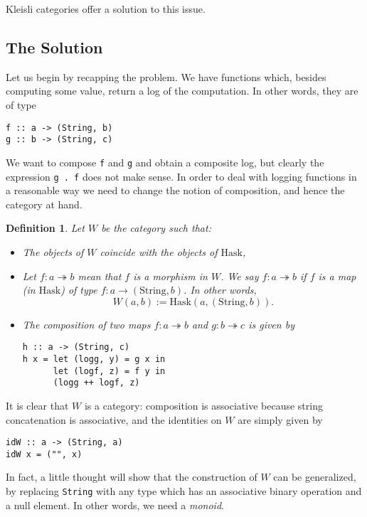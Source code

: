 \documentclass[11pt]{article}
\newtheorem{definition}{Definition}
\theoremstyle{nonumberplain}
\newcommand{\Hask}{\mathrm{Hask}}
\newcommand{\type}[1]{\mathrm{#1}}
\newcommand*\lsin{\lstinline}
\begin{document}
Kleisli categories offer a solution to this issue.

\subsection{The Solution}

Let us begin by recapping the problem. We have functions which, besides computing some value, return a log of the computation. In other words, they are of type
\begin{lstlisting}
f :: a -> (String, b)
g :: b -> (String, c)
\end{lstlisting}

We want to compose \lsin|f| and \lsin|g| and obtain a composite log, but clearly the expression \lsin|g . f| does not make sense. In order to deal with logging functions in a reasonable way we need to change the notion of composition, and hence the category at hand.

\begin{definition}\label{def:kleisli}
Let $W$ be the category such that:
\begin{itemize}
\item The objects of $W$ coincide with the objects of $\Hask$,
\item Let $f \colon a \twoheadrightarrow b$ mean that $f$ is a morphism in $W$. We say $f \colon a \twoheadrightarrow b$ if $f$ is a map (in $\Hask$) of type $f \colon a \to (\type{String}, b)$. In other words,
\begin{equation}
W(a,b) := \Hask(a, (\type{String},b)).
\end{equation}
\item The composition of two maps $f \colon a \twoheadrightarrow b$ and $g \colon b \twoheadrightarrow c$ is given by
\begin{lstlisting}
h :: a -> (String, c)
h x = let (logg, y) = g x in
      let (logf, z) = f y in
      (logg ++ logf, z)
\end{lstlisting}
\end{itemize}
\end{definition}

It is clear that $W$ is a category: composition is associative because string concatenation is associative, and the identities on $W$ are simply given by
\begin{lstlisting}
idW :: a -> (String, a)
idW x = ("", x)
\end{lstlisting}

In fact, a little thought will show that the construction of $W$ can be generalized, by replacing \lsin|String| with any type which has an associative binary operation and a null element. In other words, we need a \emph{monoid}.
\end{document}
